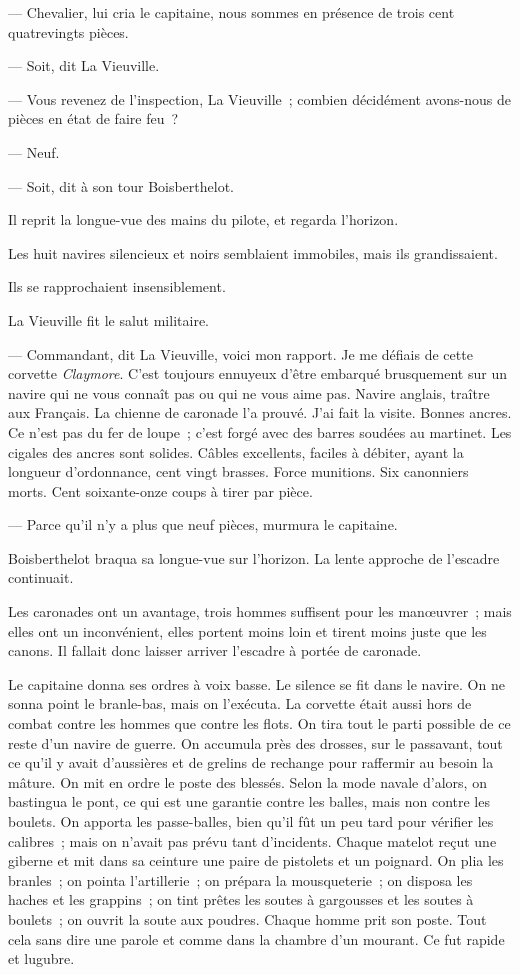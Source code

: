 \documentclass[french,twoside]{book} %
\begin{document}
— Chevalier, lui cria le capitaine, nous sommes en présence de trois cent quatrevingts pièces.\par
— Soit, dit La Vieuville.\par
— Vous revenez de l’inspection, La Vieuville ; combien décidément avons-nous de pièces en état de faire feu ?\par
— Neuf.\par
— Soit, dit à son tour Boisberthelot.\par
Il reprit la longue-vue des mains du pilote, et regarda l’horizon.\par
Les huit navires silencieux et noirs semblaient immobiles, mais ils grandissaient.\par
Ils se rapprochaient insensiblement.\par
La Vieuville fit le salut militaire.\par
— Commandant, dit La Vieuville, voici mon rapport. Je me défiais de cette corvette \emph{Claymore}. C’est toujours ennuyeux d’être embarqué brusquement sur un navire qui ne vous connaît pas ou qui ne vous aime pas. Navire anglais, traître aux Français. La chienne de caronade l’a prouvé. J’ai fait la visite. Bonnes ancres. Ce n’est pas du fer de loupe ; c’est forgé avec des barres soudées au martinet. Les cigales  des ancres sont solides. Câbles excellents, faciles à débiter, ayant la longueur d’ordonnance, cent vingt brasses. Force munitions. Six canonniers morts. Cent soixante-onze coups à tirer par pièce.\par
— Parce qu’il n’y a plus que neuf pièces, murmura le capitaine.\par
Boisberthelot braqua sa longue-vue sur l’horizon. La lente approche de l’escadre continuait.\par
Les caronades ont un avantage, trois hommes suffisent pour les manœuvrer ; mais elles ont un inconvénient, elles portent moins loin et tirent moins juste que les canons. Il fallait donc laisser arriver l’escadre à portée de caronade.\par
Le capitaine donna ses ordres à voix basse. Le silence se fit dans le navire. On ne sonna point le branle-bas, mais on l’exécuta. La corvette était aussi hors de combat contre les hommes que contre les flots. On tira tout le parti possible de ce reste d’un navire de guerre. On accumula près des drosses, sur le passavant, tout ce qu’il y avait d’aussières et de grelins de rechange pour raffermir au besoin la mâture. On mit en ordre le poste des blessés. Selon la mode navale d’alors, on bastingua le pont, ce qui est une garantie contre les balles, mais non contre les boulets. On apporta les passe-balles, bien qu’il fût un peu tard pour vérifier les calibres ; mais on n’avait pas prévu tant d’incidents. Chaque matelot reçut une giberne et mit dans sa ceinture une paire de pistolets et un poignard. On plia les branles ; on pointa l’artillerie ; on prépara la mousqueterie ; on disposa les haches et  les grappins ; on tint prêtes les soutes à gargousses et les soutes à boulets ; on ouvrit la soute aux poudres. Chaque homme prit son poste. Tout cela sans dire une parole et comme dans la chambre d’un mourant. Ce fut rapide et lugubre.\par
\end{document}
